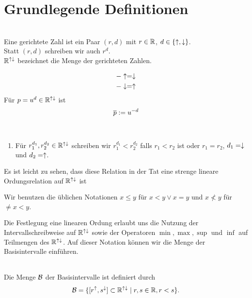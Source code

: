 \section{Grundlegende Definitionen}

\begin{dfn}\ \\
    Eine gerichtete Zahl ist ein Paar $(r,d)$ mit $r \in \mathbb{R}$, $d \in \{\uparrow, \downarrow\}$.\\
    Statt $(r,d)$ schreiben wir auch $r^d$.\\
    $\mathbb{R}^{{\uparrow \downarrow}}$ bezeichnet die Menge der gerichteten Zahlen.
\end{dfn}

\begin{nota}
    \begin{align*}
        -\uparrow = \downarrow\\
        -\downarrow = \uparrow
    \end{align*}
    Für $p = u^d \in \mathbb{R}^{{\uparrow \downarrow}}$ ist
    \begin{align*}
        \overline{p} := u^{-d}
    \end{align*}
\end{nota}

\begin{dfn}\ \\
    \begin{enumerate}
        \item Für $r_1^{d_1},r_2^{d_2} \in \mathbb{R}^{{\uparrow \downarrow}}$ schreiben wir $r_1^{d_1} < r_2^{d_2}$ falls $r_1 < r_2$ ist oder $r_1 = r_2$, $d_1 = \downarrow$ und $d_2 = \uparrow$.
    \end{enumerate}
\end{dfn}
Es ist leicht zu sehen, dass diese Relation in der Tat eine strenge lineare Ordungsrelation auf $\mathbb{R}^{{\uparrow \downarrow}}$ ist

Wir benutzen die üblichen Notationen $x \leq y$ für $x < y \lor x = y$ und $x \nless y$ für $\neq x < y$.

Die Festlegung eine linearen Ordung erlaubt uns die Nutzung der Intervallschreibweise auf $\mathbb{R}^{{\uparrow \downarrow}}$ sowie der Operatoren $\min, \max, \sup$ und $\inf$ auf Teilmengen des $\mathbb{R}^{{\uparrow \downarrow}}$. 
Auf dieser Notation können wir die Menge der Basisintervalle einführen.

\begin{dfn}[Basisintervalle]\ \\
    Die Menge $\mathcal{B}$ der Basisintervalle ist definiert durch
    \begin{align*}
        \mathcal{B} = \{[r^{\uparrow}, s^{\downarrow}] \subset \mathbb{R}^{{\uparrow \downarrow}} \mid r,s \in \mathbb{R}, r<s\}.
    \end{align*}
\end{dfn}

